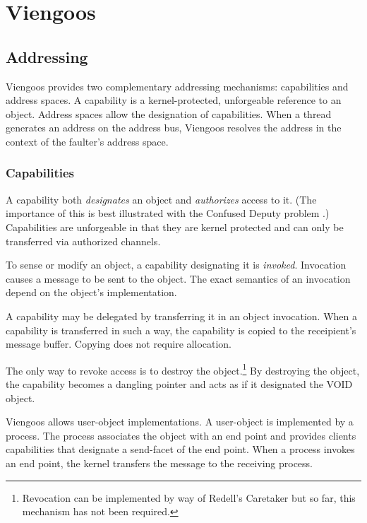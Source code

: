 \part{Viengoos}

\chapter{Addressing}

Viengoos provides two complementary addressing mechanisms:
capabilities and address spaces.  A capability is a kernel-protected,
unforgeable reference to an object.  Address spaces allow the
designation of capabilities.  When a thread generates an address on
the address bus, Viengoos resolves the address in the context of the
faulter's address space.

\section{Capabilities}

A capability both \emph{designates} an object and \emph{authorizes}
access to it.  (The importance of this is best illustrated with the
Confused Deputy problem \cite{hardy88confused-deputy}.)  Capabilities
are unforgeable in that they are kernel protected and can only be
transferred via authorized channels.

To sense or modify an object, a capability designating it is
\emph{invoked}.  Invocation causes a message to be sent to the object.
The exact semantics of an invocation depend on the object's
implementation.

A capability may be delegated by transferring it in an object
invocation.  When a capability is transferred in such a way, the
capability is copied to the receipient's message buffer.  Copying does
not require allocation.

The only way to revoke access is to destroy the
object.\footnote{Revocation can be implemented by way of Redell's
  Caretaker but so far, this mechanism has not been required.}  By
destroying the object, the capability becomes a dangling pointer and
acts as if it designated the VOID object.

Viengoos allows user-object implementations.  A user-object is
implemented by a process.  The process associates the object with an
end point and provides clients capabilities that designate a
send-facet of the end point.  When a process invokes an end point, the
kernel transfers the message to the receiving process.

